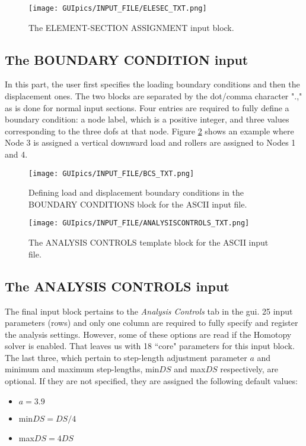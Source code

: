 \begin{appendices}
\begin{figure}[t]
	\centering
	\texttt{[image: GUIpics/INPUT\_FILE/ELESEC\_TXT.png]}
	\caption{The ELEMENT-SECTION ASSIGNMENT input block.}
	\label{fig:ELESECS}
\end{figure}

\subsection*{The BOUNDARY CONDITION input}

In this part, the user first specifies the loading boundary conditions and then 
the displacement ones. The two blocks are separated by the dot/comma character 
".," as is done for normal input sections. Four entries are required to fully 
define a boundary condition: a node label, which is a positive integer, and 
three values corresponding to the three \acrshort{dof}s at that node. Figure 
\ref{fig:BCS} shows an example where Node 3 is assigned a vertical downward 
load and rollers are assigned to Nodes 1 and 4.

\begin{figure}[t]
	\centering
	\texttt{[image: GUIpics/INPUT\_FILE/BCS\_TXT.png]}
	\caption{Defining load and displacement boundary conditions in the BOUNDARY 
		CONDITIONS block for the ASCII input file.}
	\label{fig:BCS}
\end{figure}

\begin{figure}[t]
	\centering
	\texttt{[image: GUIpics/INPUT\_FILE/ANALYSISCONTROLS\_TXT.png]}
	\caption{The ANALYSIS CONTROLS template block for the ASCII input file.}
	\label{fig:ANALYSIS}
\end{figure}

\subsection*{The ANALYSIS CONTROLS input}
The final input block pertains to the \textit{Analysis Controls} tab in the 
\acrshort{gui}. 25 input parameters (rows) and only one column are required to 
fully 
specify and register the analysis settings. However, some of these options are 
read if the Homotopy solver is enabled. That leaves us with 18 ``core" 
parameters for this input block. The last three, which pertain to step-length 
adjustment parameter $a$ and minimum and maximum step-lengths, min$DS$ and 
max$DS$ respectively, are optional. If they are not specified, they are 
assigned the following default values:
\begin{itemize}
	\item $a=3.9$
	\item min$DS = DS/4$
	\item max$DS = 4DS$
\end{itemize}


\end{appendices}
